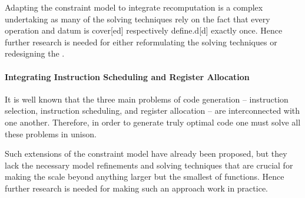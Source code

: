 Adapting the \gls{constraint model} to integrate \gls{recomputation} is a
complex undertaking as many of the solving techniques rely on the fact that
every \gls{operation} and \gls{datum} is \gls{cover}[ed] respectively
\gls{define.d}[d] exactly once.
%
Hence further research is needed for either reformulating the solving techniques
or redesigning the .


\paragraph{Integrating Instruction Scheduling and Register Allocation}

It is well known that the three main problems of \gls{code generation} --
\gls{instruction selection}, \gls{instruction scheduling}, and \gls{register
  allocation} -- are interconnected with one another.
%
Therefore, in order to generate truly optimal code one must solve all these
problems in unison.

Such extensions of the \gls{constraint model} have already been proposed, but
they lack the necessary model refinements and solving techniques that are
crucial for making the  scale beyond anything larger
but the smallest of \glspl{function}.
%
Hence further research is needed for making such an approach work in practice.
